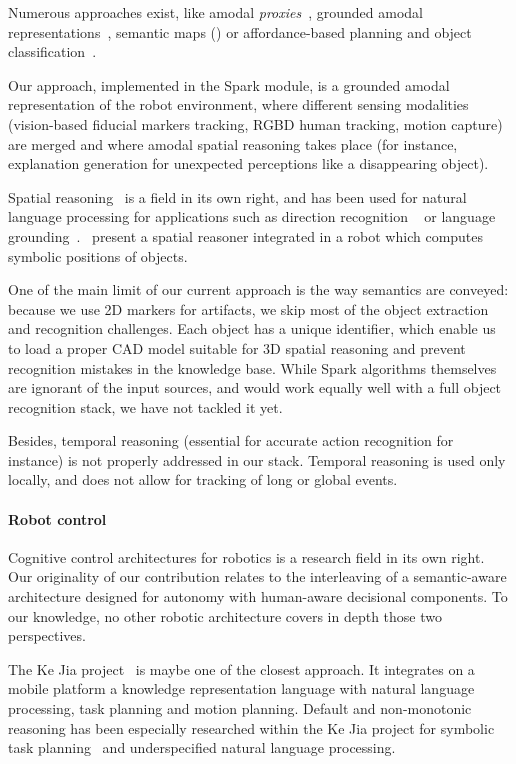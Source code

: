 \documentclass[preprint,3p,times]{elsarticle}
\begin{document}
Numerous approaches exist, like amodal \emph{proxies}~\cite{Jacobsson2008},
grounded amodal representations~\cite{Mavridis2006}, semantic maps
(\cite{Nuechter2008, Galindo2008,Blodow2011}) or
affordance-based planning and object classification~\cite{Lorken2008,
Varadarajan2011}.

Our approach, implemented in the {\sc Spark} module, is a grounded amodal
representation of the robot environment, where different sensing modalities
(vision-based fiducial markers tracking, RGBD human tracking, motion capture)
are merged and where amodal spatial reasoning takes place (for instance,
explanation generation for unexpected perceptions like a disappearing object).

Spatial reasoning~\cite{O'Keefe1999} is a field in its own right, and has been
used for natural language processing for applications such as direction
recognition ~\cite{Kollar2010,Matuszek2010} or language
grounding~\cite{Tellex2010}.~\cite{Skubic2004} present a spatial reasoner
integrated in a robot which computes symbolic positions of objects.

One of the main limit of our current approach is the way semantics are
conveyed: because we use 2D markers for artifacts, we skip most of the object
extraction and recognition challenges. Each object has a unique identifier,
which enable us to load a proper CAD model suitable for 3D spatial reasoning
and prevent recognition mistakes in the knowledge base. While {\sc Spark}
algorithms themselves are ignorant of the input sources, and would work equally
well with a full object recognition stack, we have not tackled it yet.

Besides, temporal reasoning (essential for accurate action recognition for
instance) is not properly addressed in our stack. Temporal reasoning is used
only locally, and does not allow for tracking of long or global events.

\paragraph{Robot control}

Cognitive control architectures for robotics is a research field in its own right.
Our originality of our contribution relates to the interleaving of a
semantic-aware architecture designed for autonomy with human-aware decisional
components. To our knowledge, no other robotic architecture covers in depth
those two perspectives.

The Ke Jia project~\cite{Chen2010} is maybe one of the closest approach. It
integrates on a mobile platform a knowledge representation language with
natural language processing, task planning and motion planning. Default and
non-monotonic reasoning has been especially researched within the Ke Jia
project for symbolic task planning~\cite{Ji2011} and underspecified natural
language processing.
\end{document}
